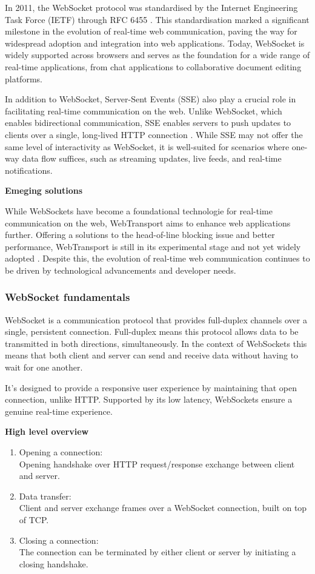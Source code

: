 In 2011, the WebSocket protocol was standardised by the Internet Engineering Task Force (IETF) through RFC 6455 \cite{mdn-ws}. This standardisation marked a significant milestone in the evolution of real-time web communication, paving the way for widespread adoption and integration into web applications. Today, WebSocket is widely supported across browsers and serves as the foundation for a wide range of real-time applications, from chat applications to collaborative document editing platforms.

In addition to WebSocket, Server-Sent Events (SSE) also play a crucial role in facilitating real-time communication on the web. Unlike WebSocket, which enables bidirectional communication, SSE enables servers to push updates to clients over a single, long-lived HTTP connection \cite{mdn-sse}. While SSE may not offer the same level of interactivity as WebSocket, it is well-suited for scenarios where one-way data flow suffices, such as streaming updates, live feeds, and real-time notifications.

\textbf{Emeging solutions}

While WebSockets have become a foundational technologie for real-time communication on the web, WebTransport aims to enhance web applications further. Offering a solutions to the head-of-line blocking issue and better performance, WebTransport is still in its experimental stage and not yet widely adopted \cite{mdn-wt}. Despite this, the evolution of real-time web communication continues to be driven by technological advancements and developer needs.

\subsubsection{WebSocket fundamentals}

WebSocket is a communication protocol that provides full-duplex channels over a single, persistent connection. Full-duplex means this protocol allows data to be transmitted in both directions, simultaneously. In the context of WebSockets this means that both client and server can send and receive data without having to wait for one another.

It's designed to provide a responsive user experience by maintaining that open connection, unlike HTTP. Supported by its low latency, WebSockets ensure a genuine real-time experience. \cite{ws-rfc}

\textbf{High level overview}

\begin{enumerate}
  \item Opening a connection: \\ Opening handshake over HTTP request/response exchange between client and server.
  \item Data transfer: \\ Client and server exchange frames over a WebSocket connection, built on top of TCP.
  \item Closing a connection: \\ The connection can be terminated by either client or server by initiating a closing handshake.
\end{enumerate}

